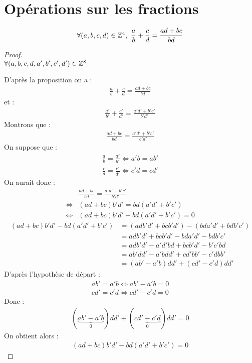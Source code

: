 \section{Opérations sur les fractions}

\begin{graybox}
	\begin{proposition}
		\begin{align*}
			\forall (a, b, c, d) \in \mathbb{Z}^4,\ \frac{a}{b} + \frac{c}{d} = \frac{ad + bc}{bd}	
		\end{align*}
	\end{proposition}
\end{graybox}

\begin{proof}~
	\\
	$\forall (a, b, c, d, a', b', c', d') \in \mathbb{Z}^8$
	
	\noindent D'après la proposition on a :
	\begin{align*}
		\frac{a}{b} + \frac{c}{d} = \frac{ad + bc}{bd}
	\end{align*}
	et :
	\begin{align*}
		\frac{a'}{b'} + \frac{c'}{d'} = \frac{a'd' + b'c'}{b'd'}
	\end{align*}
	Montrons que : 
	\begin{align*}
		\frac{ad + bc}{bd} = \frac{a'd' + b'c'}{b'd'}
	\end{align*}
	On suppose que : 
	\begin{align*}
		\frac{a}{b} = \frac{a'}{b'} \iff a'b = ab' \\
		\frac{c}{d} = \frac{c'}{d'} \iff c'd = cd'
	\end{align*}
	On aurait donc :
	\begin{align*}
		&\frac{ad + bc}{bd} = \frac{a'd' + b'c'}{b'd'} \\
		\iff &(ad + bc)b'd' = bd(a'd' + b'c') \\
		\iff &(ad + bc)b'd' - bd(a'd' + b'c') = 0
	\end{align*}
	\begin{align*}
		(ad + bc)b'd' - bd(a'd' + b'c') &= (adb'd' + bcb'd') - (bda'd' + bdb'c')\\
		&= adb'd' + bcb'd' - bda'd' - bdb'c' \\
		&= adb'd' - a'd'bd + bcb'd' - b'c'bd \\
		&= ab'dd' - a'bdd' + cd'bb' - c'dbb' \\
		&= (ab' - a'b)dd' + (cd' - c'd)dd'
	\end{align*}
	D'après l'hypothèse de départ :
	\begin{align*}
		ab' = a'b \iff ab' - a'b = 0 \\
		cd' = c'd \iff cd' - c'd = 0
	\end{align*}
	Donc : 
	\begin{align*}
		(\underbrace{ab' - a'b}_{0})dd' + (\underbrace{cd' - c'd}_0)dd' = 0
	\end{align*}
	On obtient alors :
	\begin{align*}
		(ad + bc)b'd' - bd(a'd' + b'c') = 0
	\end{align*}
\end{proof}

